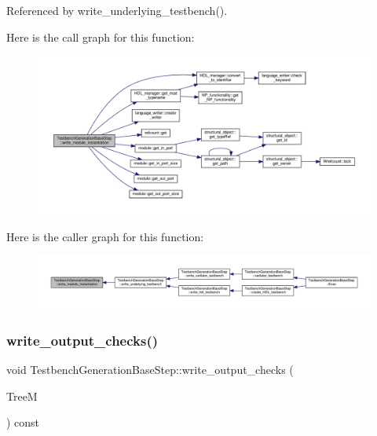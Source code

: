 Referenced by write\+\_\+underlying\+\_\+testbench().

Here is the call graph for this function\+:
\nopagebreak
\begin{figure}[H]
\begin{center}
\leavevmode
\includegraphics[width=350pt]{dc/d02/classTestbenchGenerationBaseStep_aaa5345d601cfdea191b4f42906095e8e_cgraph}
\end{center}
\end{figure}
Here is the caller graph for this function\+:
\nopagebreak
\begin{figure}[H]
\begin{center}
\leavevmode
\includegraphics[width=350pt]{dc/d02/classTestbenchGenerationBaseStep_aaa5345d601cfdea191b4f42906095e8e_icgraph}
\end{center}
\end{figure}
\mbox{\label{classTestbenchGenerationBaseStep_a4739acf051dcddc240eee6d1a4719308}} 
\subsubsection{\texorpdfstring{write\+\_\+output\+\_\+checks()}{write\_output\_checks()}}
{\footnotesize\ttfamily void Testbench\+Generation\+Base\+Step\+::write\+\_\+output\+\_\+checks (\begin{DoxyParamCaption}\item[{const \hyperlink{tree__manager_8hpp_a792e3f1f892d7d997a8d8a4a12e39346}{tree\+\_\+manager\+Const\+Ref}}]{TreeM }\end{DoxyParamCaption}) const\hspace{0.3cm}{\ttfamily [protected]}}



